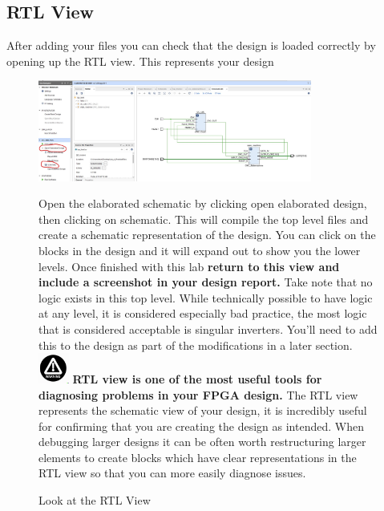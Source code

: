 \subsection{RTL View}
After adding your files you can check that the design is loaded correctly by opening up the RTL view. This represents your design
\begin{figure}[H]
    \centering
    \includegraphics[width = 9cm] {Images/CreateBitstreamImages/OpenElaboratedDesign.jpg}
    \caption{Look at the RTL View}
    \label{fig:enter-label}
    \raggedright
    \vspace{0.5cm}
    Open the elaborated schematic by clicking open elaborated design, then clicking on schematic. This will compile the top level files and create a schematic representation of the design.
    You can click on the blocks in the design and it will expand out to show you the lower levels. Once finished with this lab \textbf{return to this view and include a screenshot in your design report.} Take note that no logic exists in this top level. While technically possible to have logic at any level, it is considered especially bad practice, the most logic that is considered acceptable is singular inverters. You'll need to add this to the design as part of the modifications in a later section. \\
    \vspace{0.5cm}
    \includegraphics[height=1cm]{Images/Alert Icon.png}  \textbf{RTL view is one of the most useful tools for diagnosing problems in your FPGA design.} The RTL view represents the schematic view of your design, it is incredibly useful for confirming that you are creating the design as intended. When debugging larger designs it can be often worth restructuring larger elements to create blocks which have clear representations in the RTL view so that you can more easily diagnose issues. 
\end{figure}

